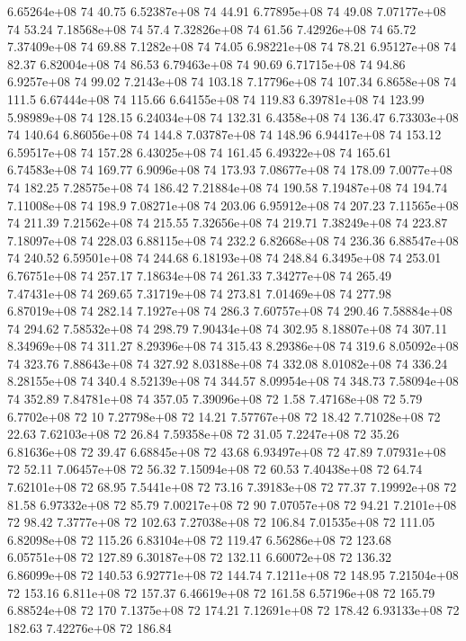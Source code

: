 6.65264e+08 74 40.75
6.52387e+08 74 44.91
6.77895e+08 74 49.08
7.07177e+08 74 53.24
7.18568e+08 74 57.4
7.32826e+08 74 61.56
7.42926e+08 74 65.72
7.37409e+08 74 69.88
7.1282e+08 74 74.05
6.98221e+08 74 78.21
6.95127e+08 74 82.37
6.82004e+08 74 86.53
6.79463e+08 74 90.69
6.71715e+08 74 94.86
6.9257e+08 74 99.02
7.2143e+08 74 103.18
7.17796e+08 74 107.34
6.8658e+08 74 111.5
6.67444e+08 74 115.66
6.64155e+08 74 119.83
6.39781e+08 74 123.99
5.98989e+08 74 128.15
6.24034e+08 74 132.31
6.4358e+08 74 136.47
6.73303e+08 74 140.64
6.86056e+08 74 144.8
7.03787e+08 74 148.96
6.94417e+08 74 153.12
6.59517e+08 74 157.28
6.43025e+08 74 161.45
6.49322e+08 74 165.61
6.74583e+08 74 169.77
6.9096e+08 74 173.93
7.08677e+08 74 178.09
7.0077e+08 74 182.25
7.28575e+08 74 186.42
7.21884e+08 74 190.58
7.19487e+08 74 194.74
7.11008e+08 74 198.9
7.08271e+08 74 203.06
6.95912e+08 74 207.23
7.11565e+08 74 211.39
7.21562e+08 74 215.55
7.32656e+08 74 219.71
7.38249e+08 74 223.87
7.18097e+08 74 228.03
6.88115e+08 74 232.2
6.82668e+08 74 236.36
6.88547e+08 74 240.52
6.59501e+08 74 244.68
6.18193e+08 74 248.84
6.3495e+08 74 253.01
6.76751e+08 74 257.17
7.18634e+08 74 261.33
7.34277e+08 74 265.49
7.47431e+08 74 269.65
7.31719e+08 74 273.81
7.01469e+08 74 277.98
6.87019e+08 74 282.14
7.1927e+08 74 286.3
7.60757e+08 74 290.46
7.58884e+08 74 294.62
7.58532e+08 74 298.79
7.90434e+08 74 302.95
8.18807e+08 74 307.11
8.34969e+08 74 311.27
8.29396e+08 74 315.43
8.29386e+08 74 319.6
8.05092e+08 74 323.76
7.88643e+08 74 327.92
8.03188e+08 74 332.08
8.01082e+08 74 336.24
8.28155e+08 74 340.4
8.52139e+08 74 344.57
8.09954e+08 74 348.73
7.58094e+08 74 352.89
7.84781e+08 74 357.05
7.39096e+08 72 1.58
7.47168e+08 72 5.79
6.7702e+08 72 10
7.27798e+08 72 14.21
7.57767e+08 72 18.42
7.71028e+08 72 22.63
7.62103e+08 72 26.84
7.59358e+08 72 31.05
7.2247e+08 72 35.26
6.81636e+08 72 39.47
6.68845e+08 72 43.68
6.93497e+08 72 47.89
7.07931e+08 72 52.11
7.06457e+08 72 56.32
7.15094e+08 72 60.53
7.40438e+08 72 64.74
7.62101e+08 72 68.95
7.5441e+08 72 73.16
7.39183e+08 72 77.37
7.19992e+08 72 81.58
6.97332e+08 72 85.79
7.00217e+08 72 90
7.07057e+08 72 94.21
7.2101e+08 72 98.42
7.3777e+08 72 102.63
7.27038e+08 72 106.84
7.01535e+08 72 111.05
6.82098e+08 72 115.26
6.83104e+08 72 119.47
6.56286e+08 72 123.68
6.05751e+08 72 127.89
6.30187e+08 72 132.11
6.60072e+08 72 136.32
6.86099e+08 72 140.53
6.92771e+08 72 144.74
7.1211e+08 72 148.95
7.21504e+08 72 153.16
6.811e+08 72 157.37
6.46619e+08 72 161.58
6.57196e+08 72 165.79
6.88524e+08 72 170
7.1375e+08 72 174.21
7.12691e+08 72 178.42
6.93133e+08 72 182.63
7.42276e+08 72 186.84
